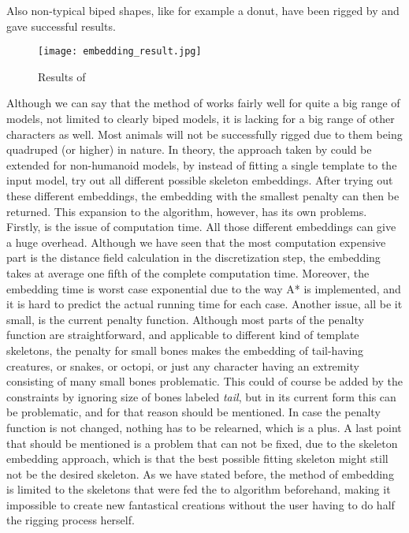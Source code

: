 \documentclass{article}
\begin{document}
Also non-typical biped shapes, like for example a donut, have been rigged by \citep{paper1} and gave
successful results.
\begin{figure}[h]
    \centering
    \texttt{[image: embedding\_result.jpg]}
    \caption{Results of \citep{paper1}}
    \label{fig:results1.png}
\end{figure}

Although we can say that the method of \citep{paper1} works fairly well for
quite a big range of models, not limited to clearly biped models, it is lacking for a big range of other characters
as well. Most animals will not be successfully rigged due to them being quadruped
(or higher)
in nature. In theory, the approach taken by \citep{paper1} could be extended for
non-humanoid models, by instead of fitting a single template to the input model,
try out all different possible skeleton
embeddings. After trying out these different embeddings, the embedding with the
smallest penalty can then be returned. This expansion to the algorithm, however,
has its own problems. Firstly, is the issue of computation time. All those different embeddings can give a 
huge overhead. Although we have seen that the most computation expensive part is
the distance field calculation in the discretization step, the embedding takes
at average one fifth of the complete computation time. Moreover, the
embedding time is worst case exponential due to the way A* is implemented, 
and it is hard to predict the actual running time for each case.
Another issue, all be it small, is the current penalty function. Although most parts of the penalty
function are straightforward, and applicable to different kind of template
skeletons, the penalty for small bones makes the embedding of tail-having
creatures, or snakes, or octopi, or just any character having an extremity
consisting of many small bones problematic. This could of course be added by the constraints
by ignoring size of bones labeled \emph{tail}, but in its current form this can
be problematic, and for that reason should be mentioned. In case the penalty
function is not changed, nothing has to be relearned, which is a plus.
A last point that should be mentioned is a problem that can not be fixed, due to
the skeleton embedding approach, which is that the best possible fitting
skeleton might still not be the desired skeleton. As we have stated before, the
method of embedding is limited to the skeletons that were fed the to algorithm
beforehand, making it impossible to create new fantastical creations without
the user having to do half the rigging process herself.
\end{document}

